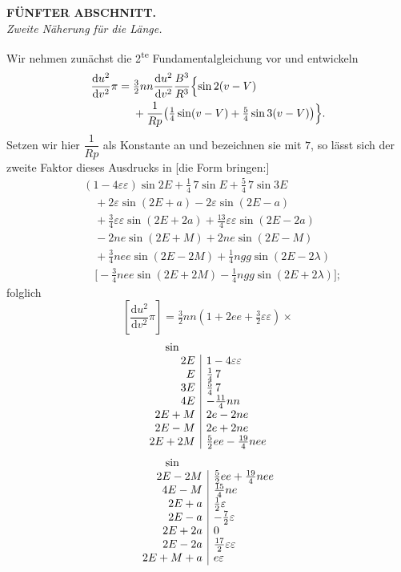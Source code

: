 \clearpage
\begingroup
{}
\renewcommand{\headrulewidth}{0pt}
\begin{center}
\textbf{FÜNFTER ABSCHNITT.}\\[8pt]
\textit{Zweite Näherung für die Länge.}
\end{center}
\par\noindent\hspace*{\parindent}Wir nehmen zunächst die 2\textsuperscript{te} Fundamentalgleichung vor und entwickeln
\[
\begin{aligned}
\frac{\mathrm du^2}{\mathrm dv^2}\pi
={}&\tfrac32nn\frac{\mathrm du^2}{\mathrm dv^2}\frac{B^3}{R^3}
\Bigl\{\sin2(v-V)\\
&+\frac{1}{Rp}\bigl(\tfrac14\sin(v-V)+\tfrac54\sin3(v-V)\bigr)\Bigr\}.
\end{aligned}
\]
\noindent Setzen wir hier \(\dfrac{1}{Rp}\) als Konstante an und bezeichnen sie mit \(7\),
so lässt sich der zweite Faktor dieses Ausdrucks in [die Form bringen:]
\[
\begin{aligned}
&(1-4\varepsilon\varepsilon)\sin2E+\tfrac14\,7\sin E+\tfrac54\,7\sin3E\\
&\quad+2\varepsilon\sin(2E+a)-2\varepsilon\sin(2E-a)\\
&\quad+\tfrac34\varepsilon\varepsilon\sin(2E+2a)+\tfrac{13}{4}\varepsilon\varepsilon\sin(2E-2a)\\
&\quad-2ne\sin(2E+M)+2ne\sin(2E-M)\\
&\quad+\tfrac34nee\sin(2E-2M)+\tfrac14ngg\sin(2E-2\lambda)\\
&\quad\bigl[-\tfrac34nee\sin(2E+2M)-\tfrac14ngg\sin(2E+2\lambda)\bigr];
\end{aligned}
\]
\noindent folglich
\[
\left[\frac{\mathrm du^2}{\mathrm dv^2}\pi\right]
=\tfrac32nn(1+2ee+\tfrac32\varepsilon\varepsilon)\times
\]
\[
\begin{array}{r|l}
\multicolumn{1}{c}{\sin}&\\
2E&1-4\varepsilon\varepsilon\\
E&\tfrac14\,7\\
3E&\tfrac54\,7\\
4E&-\tfrac{11}{4}nn\\
2E+M&2e-2ne\\
2E-M&2e+2ne\\
2E+2M&\tfrac52ee-\tfrac{19}{4}nee
\end{array}
\]
\[
\begin{array}{r|l}
\multicolumn{1}{c}{\sin}&\\
2E-2M&\tfrac52ee+\tfrac{19}{4}nee\\
4E-M&\tfrac{15}{4}ne\\
2E+a&\tfrac12\varepsilon\\
2E-a&-\tfrac72\varepsilon\\
2E+2a&0\\
2E-2a&\tfrac{17}{2}\varepsilon\varepsilon\\
2E+M+a&e\varepsilon
\end{array}
\]
